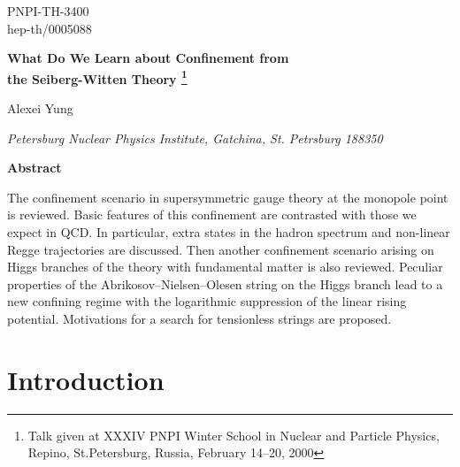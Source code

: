 \documentclass[a4paper,12pt]{article}
\begin{document}
\renewcommand{\theequation}{\thesection.\arabic{equation}}

\begin{titlepage}
\renewcommand{\thefootnote}{\fnsymbol{footnote}}

\begin{flushright}
PNPI-TH-3400\\
hep-th/0005088\\

\end{flushright}

\vfil

\begin{center}
\baselineskip20pt
{\bf \Large  What Do We Learn about Confinement from \\
the Seiberg-Witten Theory \footnote{Talk given at XXXIV PNPI
Winter School in Nuclear and Particle Physics,
 Repino, St.Petersburg, Russia, February 14--20, 2000}}
\end{center}
\vfil

\begin{center}
{\large   Alexei Yung}

\vspace{0.3cm}


{\it Petersburg Nuclear Physics Institute, Gatchina, St. Petrsburg
188350}

\vfil

{\large\bf Abstract} \vspace*{.25cm}
\end{center}

The confinement scenario in \coordHE{} supersymmetric gauge theory at
the monopole point is reviewed. Basic features of this
\coordHE{} confinement are contrasted with those we expect in QCD.
In particular, extra states in the hadron spectrum and
non-linear Regge trajectories are discussed. Then another
confinement scenario arising on Higgs branches of the theory
with fundamental matter is also reviewed.
Peculiar properties of the Abrikosov--Nielsen--Olesen string on
the Higgs branch lead to a new confining regime with the
logarithmic suppression of the linear rising potential.
Motivations for a search for tensionless strings are proposed.



\vfil

\end{titlepage}

\newpage



\section{Introduction}
\end{document}
